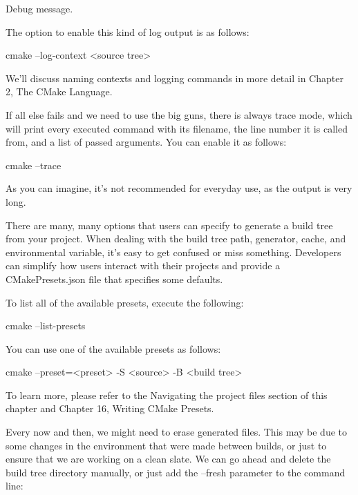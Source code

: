 \begin{shell}
 Debug message.
\end{shell}

The option to enable this kind of log output is as follows:

\begin{shell}
cmake --log-context <source tree>
\end{shell}

We’ll discuss naming contexts and logging commands in more detail in Chapter 2, The CMake Language.

If all else fails and we need to use the big guns, there is always trace mode, which will print every executed command with its filename, the line number it is called from, and a list of passed arguments. You can enable it as follows:

\begin{shell}
cmake --trace
\end{shell}

As you can imagine, it’s not recommended for everyday use, as the output is very long.


There are many, many options that users can specify to generate a build tree from your project. When dealing with the build tree path, generator, cache, and environmental variable, it’s easy to get confused or miss something. Developers can simplify how users interact with their projects and provide a CMakePresets.json file that specifies some defaults.

To list all of the available presets, execute the following:

\begin{shell}
cmake --list-presets
\end{shell}

You can use one of the available presets as follows:

\begin{shell}
cmake --preset=<preset> -S <source> -B <build tree>
\end{shell}

To learn more, please refer to the Navigating the project files section of this chapter and Chapter 16, Writing CMake Presets.


Every now and then, we might need to erase generated files. This may be due to some changes in the environment that were made between builds, or just to ensure that we are working on a clean slate. We can go ahead and delete the build tree directory manually, or just add the --fresh parameter to the command line:

